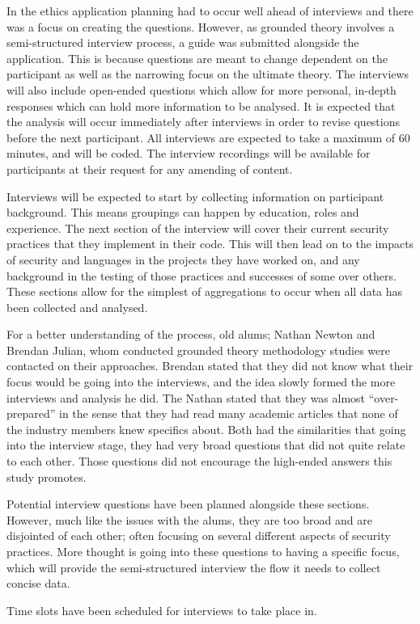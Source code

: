 \par In the ethics application planning had to occur well ahead of interviews and there was a focus on creating the questions. However, as grounded theory involves a semi-structured interview process, a guide was submitted alongside the application. This is because questions are meant to change dependent on the participant as well as the narrowing focus on the ultimate theory. The interviews will also include open-ended questions which allow for more personal, in-depth responses which can hold more information to be analysed. It is expected that the analysis will occur immediately after interviews in order to revise questions before the next participant.  All interviews are expected to take a maximum of 60 minutes, and will be coded. The interview recordings will be available for participants at their request for any amending of content.
\newline
\par Interviews will be expected to start by collecting information on participant background. This means groupings can happen by education, roles and experience. The next section of the interview will cover their current security practices that they implement in their code. This will then lead on to the impacts of security and languages in the projects they have worked on, and any background in the testing of those practices and successes of some over others. These sections allow for the simplest of aggregations to occur when all data has been collected and analysed. 
\newline
\par For a better understanding of the process, old alums; Nathan Newton and Brendan Julian, whom conducted grounded theory methodology studies were contacted on their approaches. Brendan stated that they did not know what their focus would be going into the interviews, and the idea slowly formed the more interviews and analysis he did. The Nathan stated that they was almost “over-prepared” in the sense that they had read many academic articles that none of the industry members knew specifics about. Both had the similarities that going into the interview stage, they had very broad questions that did not quite relate to each other. Those questions did not encourage the high-ended answers this study promotes. 
\newline
\par Potential interview questions have been planned alongside these sections. However, much like the issues with the alums, they are too broad and are disjointed of each other; often focusing on several different aspects of security practices. More thought is going into these questions to having a specific focus, which will provide the semi-structured interview the flow it needs to collect concise data.
\newline
\par Time slots have been scheduled for interviews to take place in.


